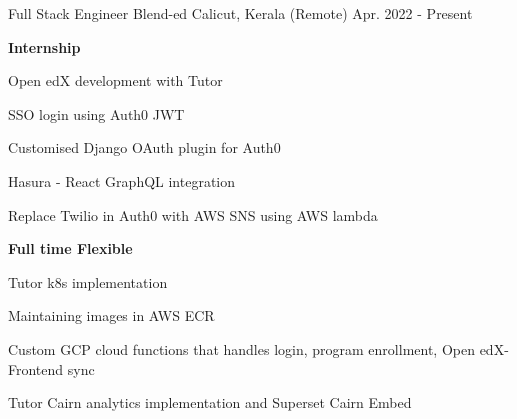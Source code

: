 \begin{cventries}
  \cventry
    {Full Stack Engineer} %
    {Blend-ed} %
    {Calicut, Kerala (Remote)   } %
    {Apr. 2022 - Present} %
    {
      \begin{cvitems} %
        \item \textbf{Internship}
        \item Open edX development with Tutor
        \item SSO login using Auth0 JWT
        \item Customised Django OAuth plugin for Auth0
        \item Hasura - React GraphQL integration
        \item Replace Twilio in Auth0 with AWS SNS using AWS lambda
        \vspace{2mm}
        \item \textbf{Full time Flexible}
        \item Tutor k8s implementation
        \item Maintaining images in AWS ECR
        \item Custom GCP cloud functions that handles login, program enrollment, Open edX-Frontend sync
        \item Tutor Cairn analytics implementation and Superset Cairn Embed
      \end{cvitems}
    }
\end{cventries}
